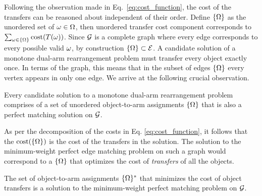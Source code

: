 Following the observation made in Eq.~\ref{eq:cost_function}, the cost of the transfers can be reasoned about independent of their order. 
Define $\{{{\Omega}}\}$ as the unordered set of ${\omega}\in{{\Omega}}$, then unordered transfer cost component corresponds to $\sum_{{\omega}\in\{{{\Omega}}\}}\textup{cost}(T({\omega}))$.
Since $ \mathcal{G} $ is a complete graph where every edge corresponds to every possible valid $ {\omega} $, by construction $ \{{{\Omega}}\} \subset \mathcal{E}$. A candidate solution of a monotone dual-arm rearrangement problem must transfer every object exactly once. In terms of the graph, this means that in the subset of edges $ \{{{\Omega}}\} $ every vertex appears in only one edge. We arrive at the following crucial observation.


{
Every candidate solution to a monotone dual-arm rearrangement problem comprises of a set of unordered object-to-arm assignments $ \{{{\Omega}}\} $ that is also a perfect matching solution on $ \mathcal{G} $.
}

As per the decomposition of the costs in Eq. \ref{eq:cost_function}, it follows that the $ \textup{cost}(\{{{\Omega}}\}) $ is the cost of the transfers in the solution. The solution to the minimum-weight perfect edge matching problem on such a graph would correspond to a $ \{{{\Omega}}\} $ that optimizes the cost of \textit{transfers} of all the objects.

{
The set of object-to-arm assignments $ \{{{\Omega}}\}^* $ that minimizes the cost of object transfers is a solution to the minimum-weight perfect matching problem on $ \mathcal{G} $.
}

